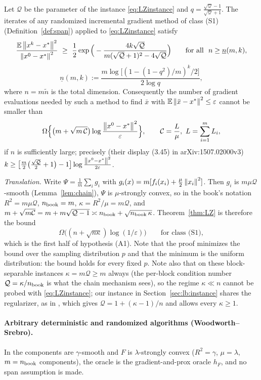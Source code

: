\begin{theorem}
\label{thm:LZ}
Let $\mathcal Q$ be the parameter of the instance \eqref{eq:LZinstance} and $q=\frac{\sqrt{\mathcal Q}-1}{\sqrt{\mathcal Q}+1}$. The iterates of any randomized incremental gradient method of class (S1) (Definition~\ref{def:span}) applied to \eqref{eq:LZinstance} satisfy
\[
\frac{\E\norm{x^k-x^\ast}^2}{\norm{x^0-x^\ast}^2}\ \ge\ \frac12\exp\Big(-\frac{4k\sqrt{\mathcal Q}}{m(\sqrt{\mathcal Q}+1)^2-4\sqrt{\mathcal Q}}\Big)
\qquad\text{for all }\ n\ge\underline n(m,k),
\]
\[
\underline n(m,k):=\frac{m\log\big[(1-(1-q^2)/m)^k/2\big]}{2\log q},
\]
where $n=m\tilde n$ is the total dimension. Consequently the number of gradient evaluations needed by such a method to find $\bar x$ with $\mathbb{E}\left\|\bar x-x^\ast\right\|^2\le\varepsilon$ cannot be smaller than
\[
\Omega\Big\{\big(m+\sqrt{m\,\mathcal C}\big)\log\frac{\left\|x^0-x^\ast\right\|^2}{\varepsilon}\Big\},\qquad \mathcal C=\frac{L}{\mu},\ L=\sum_{i=1}^mL_i ,
\]
if $n$ is sufficiently large; precisely (their display (3.45) in arXiv:1507.02000v3) $k\ge\big[\frac m2\big(\frac{\sqrt{\mathcal Q}}2+1\big)-1\big]\log\frac{\left\|x^0-x^\ast\right\|^2}{2\varepsilon}$.
\end{theorem}

\emph{Translation.} Write $\Psi=\frac1m\sum_i g_i$ with $g_i(x)=m[f_i(x_i)+\frac\mu2\left\|x_i\right\|^2]$. Then $g_i$ is $m\mu\mathcal Q$-smooth (Lemma~\ref{lem:chain}), $\Psi$ is $\mu$-strongly convex, so in the book's notation $R^2=m\mu\mathcal Q$, $n_{\rm book}=m$, $\kappa=R^2/\mu=m\mathcal Q$, and $m+\sqrt{m\mathcal C}=m+m\sqrt{\mathcal Q-1}\asymp n_{\rm book}+\sqrt{n_{\rm book}\,\kappa}$. Theorem~\ref{thm:LZ} is therefore the bound
\[
\Omega\big((n+\sqrt{n\kappa})\log(1/\varepsilon)\big)\qquad\text{for class (S1)},
\]
which is the first half of hypothesis (A1). Note that the proof minimizes the bound over the sampling distribution $p$ and that the minimum is the uniform distribution: the bound holds for every fixed $p$. Note also that on these block-separable instances $\kappa=m\mathcal Q\ge m$ always (the per-block condition number $\mathcal Q=\kappa/n_{\rm book}$ is what the chain mechanism sees), so the regime $\kappa\ll n$ cannot be probed with \eqref{eq:LZinstance}; our instance in Section~\ref{sec:lb:instance} shares the regularizer, as in \cite{agarwal2015lower}, which gives $\mathcal Q=1+(\kappa-1)/n$ and allows every $\kappa\ge1$.

\paragraph{Arbitrary deterministic and randomized algorithms (Woodworth--Srebro).}
In \cite{woodworth2016tight} the components are $\gamma$-smooth and $F$ is $\lambda$-strongly convex ($R^2=\gamma$, $\mu=\lambda$, $m=n_{\rm book}$ components), the oracle is the gradient-and-prox oracle $h_F$, and no span assumption is made.

